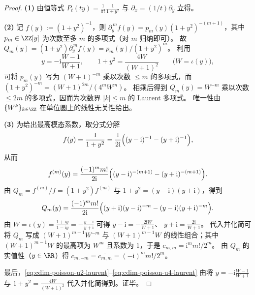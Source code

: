 \begin{proof}
\textbf{(1)} 由恒等式 \(P_t(ty)=\frac{1}{\pi t}\frac{1}{1+y^2}\) 与 \(\partial_x=(1/t)\partial_y\) 立得。
\par
\textbf{(2)} 记 \(f(y):=(1+y^2)^{-1}\)，则 \(\partial_y^{\,m}f(y)=p_m(y)(1+y^2)^{-(m+1)}\)，其中 \(p_m\in\ZZ[y]\) 为次数至多 \(m\) 的多项式（对 \(m\) 归纳即可）。
故 \(Q_m(y)=(1+y^2)\partial_y^{\,m}f(y)=p_m(y)/(1+y^2)^m\)。
利用
\[
y=-\mathrm{i}\frac{W-1}{W+1},
\qquad
1+y^2=\frac{4W}{(W+1)^2}
\qquad\bigl(W=\iota(y)\bigr),
\]
可将 \(p_m(y)\) 写为 \((W+1)^{-m}\) 乘以次数 \(\le m\) 的多项式，而 \((1+y^2)^{-m}=(W+1)^{2m}/(4^m W^m)\)。
相乘后得到 \(Q_m(y)=W^{-m}\) 乘以次数 \(\le 2m\) 的多项式，因而为次数界 \(|k|\le m\) 的 Laurent 多项式。
唯一性由 \(\{W^k\}_{k\in\ZZ}\) 在单位圆上的线性无关性给出。
\par
\textbf{(3)} 为给出最高模态系数，取分式分解
\[
f(y)=\frac{1}{1+y^2}=\frac{1}{2\mathrm{i}}\Bigl((y-\mathrm{i})^{-1}-(y+\mathrm{i})^{-1}\Bigr),
\]
从而
\[
f^{(m)}(y)=\frac{(-1)^m m!}{2\mathrm{i}}\Bigl((y-\mathrm{i})^{-(m+1)}-(y+\mathrm{i})^{-(m+1)}\Bigr).
\]
由 \(Q_m=f^{(m)}/f=(1+y^2)f^{(m)}\) 与 \(1+y^2=(y-\mathrm{i})(y+\mathrm{i})\)，得到
\[
Q_m(y)=\frac{(-1)^m m!}{2\mathrm{i}}
\Bigl((y+\mathrm{i})(y-\mathrm{i})^{-m}-(y-\mathrm{i})(y+\mathrm{i})^{-m}\Bigr).
\]
由 \(W=\iota(y)=\frac{1+\mathrm{i}y}{1-\mathrm{i}y}=-\frac{y-\mathrm{i}}{y+\mathrm{i}}\) 可得
\(
y-\mathrm{i}=-\frac{2\mathrm{i}W}{W+1}
\)、
\(
y+\mathrm{i}=\frac{2\mathrm{i}}{W+1}
\)。
代入并化简可将 \(Q_m\) 写成 \((W+1)^{m-1}W^{-m}\) 与 \((W+1)^{m-1}W\) 的线性组合；其中 \((W+1)^{m-1}W\) 的最高项为 \(W^{m}\) 且系数为 \(1\)，于是
\(
c_{m,m}=\mathrm{i}^{m}m!/2^{m}
\)。
由 \(Q_m\) 的实值性（\(y\in\RR\)）得 \(c_{m,-m}=\overline{c_{m,m}}=(-\mathrm{i})^{m}m!/2^m\)。
\par
最后，\eqref{eq:cdim-poisson-u2-laurent}--\eqref{eq:cdim-poisson-u4-laurent} 由将 \(y=-\mathrm{i}\frac{W-1}{W+1}\) 与 \(1+y^2=\frac{4W}{(W+1)^2}\) 代入并化简得到。证毕。
\end{proof}

